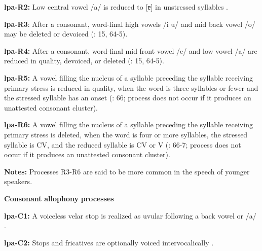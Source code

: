 \begin{styleBody}
\textbf{lpa-R2:} Low central vowel /a/ is reduced to [ɐ] in unstressed syllables \citep[34-5]{Lacrampe2014}.
\end{styleBody}

\begin{styleBody}
\textbf{lpa-R3}: After a consonant, word-final high vowels /i u/ and mid back vowel /o/ may be deleted or devoiced (\citealt{Lacrampe2014}: 15, 64-5).
\end{styleBody}

\begin{styleBody}
\textbf{lpa-R4:} After a consonant, word-final mid front vowel /e/ and low vowel /a/ are reduced in quality, devoiced, or deleted (\citealt{Lacrampe2014}: 15, 64-5).
\end{styleBody}

\begin{styleBody}
\textbf{lpa-R5:} A vowel filling the nucleus of a syllable preceding the syllable receiving primary stress is reduced in quality, when the word is three syllables or fewer and the stressed syllable has an onset (\citealt{Lacrampe2014}: 66; process does not occur if it produces an unattested consonant cluster).
\end{styleBody}

\begin{styleBody}
\textbf{lpa-R6:} A vowel filling the nucleus of a syllable preceding the syllable receiving primary stress is deleted, when the word is four or more syllables, the stressed syllable is CV, and the reduced syllable is CV or V (\citealt{Lacrampe2014}: 66-7; process does not occur if it produces an unattested consonant cluster).
\end{styleBody}

\begin{styleBody}
\textbf{Notes:} Processes R3-R6 are said to be more common in the speech of younger speakers.
\end{styleBody}

\begin{styleBody}
\textbf{Consonant} \textbf{allophony} \textbf{processes}
\end{styleBody}

\begin{styleBody}
\textbf{lpa-C1:} A voiceless velar stop is realized as uvular following a back vowel or /a/ \citep[19]{Lacrampe2014}.
\end{styleBody}

\begin{styleBody}
\textbf{lpa-C2:} Stops and fricatives are optionally voiced intervocalically \citep[17]{Lacrampe2014}.
\end{styleBody}

